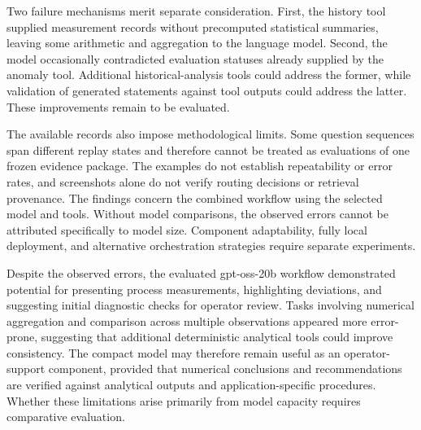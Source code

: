 Two failure mechanisms merit separate consideration. First, the history tool supplied measurement records without precomputed statistical summaries, leaving some arithmetic and aggregation to the language model. Second, the model occasionally contradicted evaluation statuses already supplied by the anomaly tool. Additional historical-analysis tools could address the former, while validation of generated statements against tool outputs could address the latter. These improvements remain to be evaluated.

The available records also impose methodological limits. Some question sequences span different replay states and therefore cannot be treated as evaluations of one frozen evidence package. The examples do not establish repeatability or error rates, and screenshots alone do not verify routing decisions or retrieval provenance. The findings concern the combined workflow using the selected model and tools. Without model comparisons, the observed errors cannot be attributed specifically to model size. Component adaptability, fully local deployment, and alternative orchestration strategies require separate experiments.

Despite the observed errors, the evaluated gpt-oss-20b workflow demonstrated potential for presenting process measurements, highlighting deviations, and suggesting initial diagnostic checks for operator review. Tasks involving numerical aggregation and comparison across multiple observations appeared more error-prone, suggesting that additional deterministic analytical tools could improve consistency. The compact model may therefore remain useful as an operator-support component, provided that numerical conclusions and recommendations are verified against analytical outputs and application-specific procedures. Whether these limitations arise primarily from model capacity requires comparative evaluation.
\FloatBarrier
